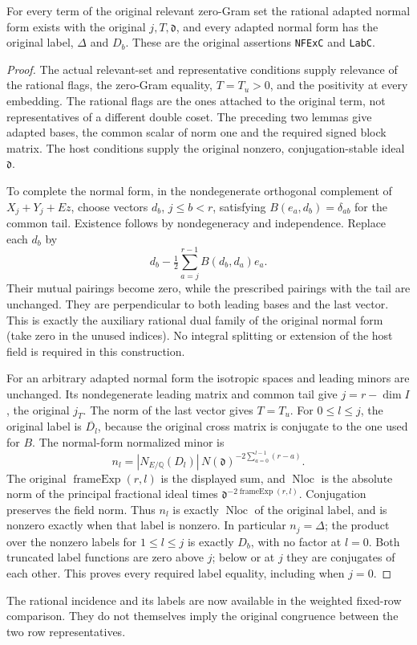\begin{theorem}
\label{thm:flag-original-nf-labels}
For every term of the original relevant zero-Gram
set the rational adapted normal form exists with
the original \(j,T,\mathfrak d\), and every adapted
normal form has the original label, \(\Delta\) and
\(D_b\). These are the original assertions
\texttt{NFExC} and \texttt{LabC}.
\end{theorem}
\begin{proof}
The actual relevant-set and representative
conditions supply relevance of the rational flags,
the zero-Gram equality, \(T=T_u>0\), and the positivity
at every embedding. The rational flags are the
ones attached to the original term, not representatives
of a different double coset. The preceding two
lemmas give adapted bases, the common scalar of
norm one and the required signed block matrix.
The host conditions supply the original nonzero,
conjugation-stable ideal \(\mathfrak d\).

To complete the normal form, in the nondegenerate
orthogonal complement of \(X_j+Y_j+Ez\), choose
vectors \(d_b\), \(j\le b<r\), satisfying
\(B(e_a,d_b)=\delta_{ab}\) for the common tail.
Existence follows by nondegeneracy and independence.
Replace each \(d_b\) by
\[
 d_b-\tfrac12\sum_{a=j}^{r-1} B(d_b,d_a)e_a.
\]
Their mutual pairings become zero, while the prescribed
pairings with the tail are unchanged. They are
perpendicular to both leading bases and the last
vector. This is exactly the auxiliary rational dual
family of the original normal form (take zero in
the unused indices). No integral splitting or extension
of the host field is required in this construction.

For an arbitrary adapted normal form the isotropic
spaces and leading minors are unchanged. Its
nondegenerate leading matrix and common tail give
\(j=r-\dim I\), the original \(j_T\).
The norm of the last vector gives \(T=T_u\).
For \(0\le l\le j\), the original label is
\(\overline{D_l}\), because the original cross
matrix is conjugate to the one used for \(B\).
The normal-form normalized minor is
\[
 n_l=|N_{E/\mathbb Q}(D_l)|\,
       N(\mathfrak d)^{-2\sum_{a=0}^{l-1}(r-a)} .
\]
The original \(\operatorname{frameExp}(r,l)\) is the
displayed sum, and \(\operatorname{Nloc}\) is the
absolute norm of the principal fractional ideal
times \(\mathfrak d^{-2\operatorname{frameExp}(r,l)}\).
Conjugation preserves the field norm. Thus \(n_l\)
is exactly \(\operatorname{Nloc}\) of the original
label, and is nonzero exactly when that label is
nonzero. In particular \(n_j=\Delta\); the product
over the nonzero labels for \(1\le l\le j\) is
exactly \(D_b\), with no factor at \(l=0\).
Both truncated label functions are zero above \(j\);
below or at \(j\) they are conjugates of each other.
This proves every required label equality, including
when \(j=0\).
\end{proof}

The rational incidence and its labels are now
available in the weighted fixed-row comparison.
They do not themselves imply the original congruence
between the two row representatives.
